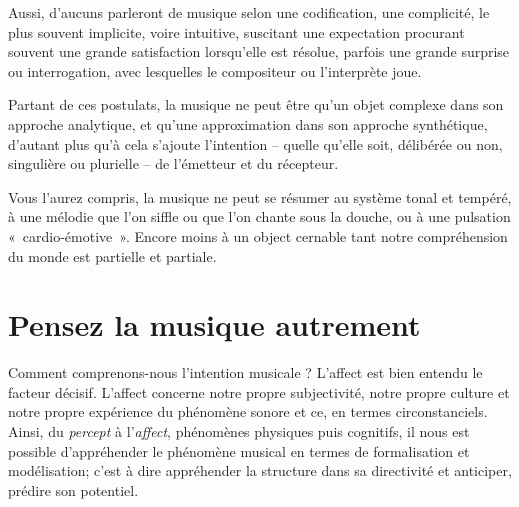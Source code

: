 \documentclass{article}
\begin{document}
Aussi, d'aucuns parleront de musique selon une codification, une complicité, le plus souvent implicite, voire intuitive, suscitant une expectation procurant souvent une grande satisfaction lorsqu'elle est résolue, parfois une grande surprise ou interrogation, avec lesquelles le compositeur ou l'interprète joue.  

\bigskip

Partant de ces postulats, la musique ne peut être qu'un objet complexe dans son approche analytique, et qu'une approximation dans son approche synthétique, d'autant plus qu'à cela s'ajoute l'intention -- quelle qu'elle soit, délibérée ou non, singulière ou plurielle -- de l'émetteur et du récepteur. 

Vous l'aurez compris, la musique ne peut se résumer au système tonal et tempéré, à une mélodie que l'on siffle ou que l'on chante sous la douche, ou à une pulsation \hbox{« cardio-}\hbox{émotive »}. Encore moins à un object cernable tant notre compréhension du monde est partielle et partiale. 

\section*{Pensez la musique autrement}
\label{think}

Comment comprenons-nous l’intention musicale ? L’affect est bien entendu le facteur décisif. L’affect concerne notre propre subjectivité, notre propre culture et notre propre expérience du phénomène sonore et ce, en termes circonstanciels. Ainsi, du \textit{percept} à l'\textit{affect}, phénomènes physiques puis cognitifs, il nous est possible d’appréhender le phénomène musical en termes de formalisation et modélisation; c'est à dire appréhender la structure dans sa directivité et anticiper, prédire son potentiel.  
\end{document}

